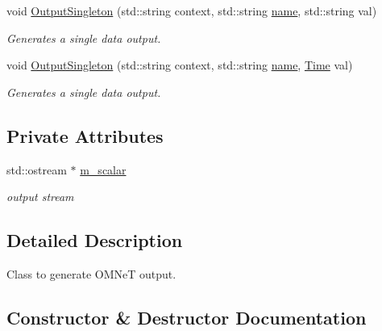\begin{DoxyCompactItemize}
void \hyperlink{classns3_1_1OmnetDataOutput_1_1OmnetOutputCallback_a346c8bfb5d33d4bc018187508e107ad0}{Output\+Singleton} (std\+::string context, std\+::string \hyperlink{generate__test__data__lte__spectrum__model_8m_ab74e6bf80237ddc4109968cedc58c151}{name}, std\+::string val)
\begin{DoxyCompactList}\small\item\em Generates a single data output. \end{DoxyCompactList}\item 
void \hyperlink{classns3_1_1OmnetDataOutput_1_1OmnetOutputCallback_ac62b32724391122997957f89ec75f9b1}{Output\+Singleton} (std\+::string context, std\+::string \hyperlink{generate__test__data__lte__spectrum__model_8m_ab74e6bf80237ddc4109968cedc58c151}{name}, \hyperlink{classns3_1_1Time}{Time} val)
\begin{DoxyCompactList}\small\item\em Generates a single data output. \end{DoxyCompactList}\end{DoxyCompactItemize}
\subsection*{Private Attributes}
\begin{DoxyCompactItemize}
\item 
std\+::ostream $\ast$ \hyperlink{classns3_1_1OmnetDataOutput_1_1OmnetOutputCallback_a9773048f745ee823d0736fd388f4522c}{m\+\_\+scalar}
\begin{DoxyCompactList}\small\item\em output stream \end{DoxyCompactList}\end{DoxyCompactItemize}


\subsection{Detailed Description}
Class to generate O\+M\+NeT output. 

\subsection{Constructor \& Destructor Documentation}
